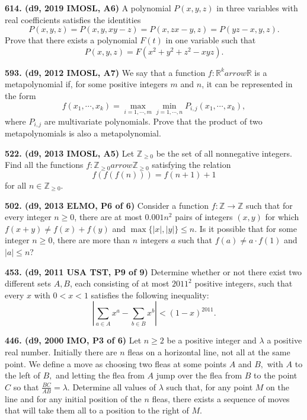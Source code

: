 \documentclass{article}
\begin{document}
\textbf{614. (\color{red}d9\color{black}, 2019 IMOSL, A6)} A polynomial $P(x, y, z)$ in three variables with real coefficients satisfies the identities
\smallbreak
$$P(x, y, z)=P(x, y, xy-z)=P(x, zx-y, z)=P(yz-x, y, z).$$
Prove that there exists a polynomial $F(t)$ in one variable such that
\smallbreak
$$P(x,y,z)=F(x^2+y^2+z^2-xyz).$$

\textbf{593. (\color{red}d9\color{black}, 2012 IMOSL, A7)} We say that a function $f:\mathbb{R}^k arrow \mathbb{R}$ is a metapolynomial if, for some positive integers $m$ and $n$, it can be represented in the form
\[f(x_1,\cdots , x_k )=\max_{i=1,\cdots , m} \min_{j=1,\cdots , n}P_{i,j}(x_1,\cdots , x_k),\]
where $P_{i,j}$ are multivariate polynomials. Prove that the product of two metapolynomials is also a metapolynomial.

\textbf{522. (\color{red}d9\color{black}, 2013 IMOSL, A5)} Let $\mathbb{Z}_{\ge 0}$ be the set of all nonnegative integers. Find all the functions $f: \mathbb{Z}_{\ge 0} arrow \mathbb{Z}_{\ge 0} $ satisfying the relation
\[ f(f(f(n))) = f(n+1 ) +1 \]
for all $ n\in \mathbb{Z}_{\ge 0}$.

\textbf{502. (\color{red}d9\color{black}, 2013 ELMO, P6 of 6)} Consider a function $f: \mathbb Z \to \mathbb Z$ such that for every integer $n \ge 0$, there are at most $0.001n^2$ pairs of integers $(x,y)$ for which $f(x+y) \neq f(x)+f(y)$ and $\max\{ \lvert x \rvert, \lvert y \rvert \} \le n$. Is it possible that for some integer $n \ge 0$, there are more than $n$ integers $a$ such that $f(a) \neq a \cdot f(1)$ and $\lvert a \rvert \le n$?

\textbf{453. (\color{red}d9\color{black}, 2011 USA TST, P9 of 9)} Determine whether or not there exist two different sets $A,B$, each consisting of at most $2011^2$ positive integers, such that every $x$ with $0 < x < 1$ satisfies the following inequality:
\[| \sum_{a \in A} x^a - \sum_{b \in B} x^b | < (1-x)^{2011}.\]

\textbf{446. (\color{red}d9\color{black}, 2000 IMO, P3 of 6)} Let $n \geq 2$ be a positive integer and $\lambda$ a positive real number. Initially there are $n$ fleas on a horizontal line, not all at the same point. We define a move as choosing two fleas at some points $A$ and $B,$  with $A$ to the left of $B,$ and letting the flea from $A$ jump over the flea from $B$ to the point $C$ so that $\frac{BC}{AB} = \lambda.$
\smallbreak
Determine all values of $\lambda$ such that, for any point $M$ on the line and for any initial position of the $n$ fleas, there exists a sequence of moves that will take them all to a position to the right of $M.$
\end{document}
